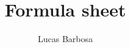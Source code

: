 \documentclass[nohyper,nobib,nofonts,oneside,openany]{tufte-book}
\title{Formula sheet}
\author{Lucas Barbosa}
\date{}
\begin{document}
\pagestyle{empty}
\renewcommand{\thesection}{\arabic{section}}

\end{document}
